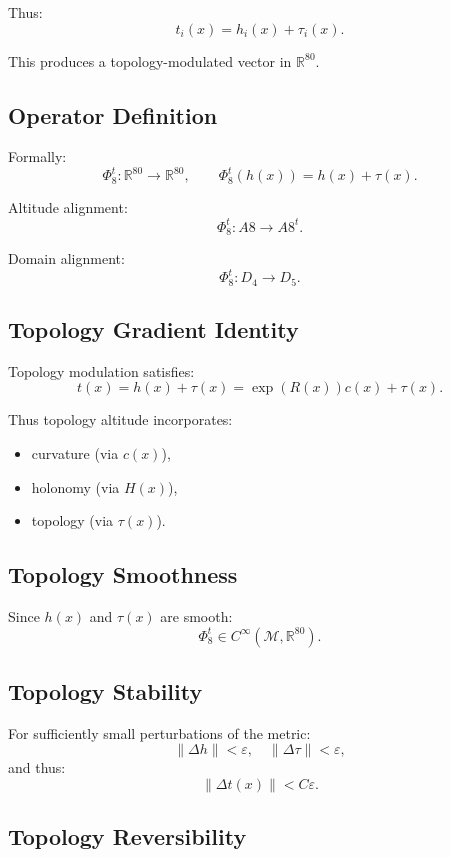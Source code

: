 Thus:
\[
t_i(x) = h_i(x) + \tau_i(x).
\]

This produces a topology-modulated vector in $\mathbb{R}^{80}$.

\subsection{Operator Definition}

Formally:
\[
\Phi_8^t : \mathbb{R}^{80} \to \mathbb{R}^{80},
\qquad
\Phi_8^t(h(x)) = h(x) + \tau(x).
\]

Altitude alignment:
\[
\Phi_8^t : A8 \to A8^t.
\]

Domain alignment:
\[
\Phi_8^t : D_4 \to D_5.
\]

\subsection{Topology Gradient Identity}

Topology modulation satisfies:
\[
t(x) = h(x) + \tau(x)
= \exp(R(x)) c(x) + \tau(x).
\]

Thus topology altitude incorporates:

\begin{itemize}
    \item curvature (via $c(x)$),
    \item holonomy (via $H(x)$),
    \item topology (via $\tau(x)$).
\end{itemize}

\subsection{Topology Smoothness}

Since $h(x)$ and $\tau(x)$ are smooth:
\[
\Phi_8^t \in C^\infty(\mathcal{M}, \mathbb{R}^{80}).
\]

\subsection{Topology Stability}

For sufficiently small perturbations of the metric:
\[
\| \Delta h \| < \varepsilon,
\quad
\| \Delta \tau \| < \varepsilon,
\]
and thus:
\[
\| \Delta t(x) \| < C \varepsilon.
\]

\subsection{Topology Reversibility}

